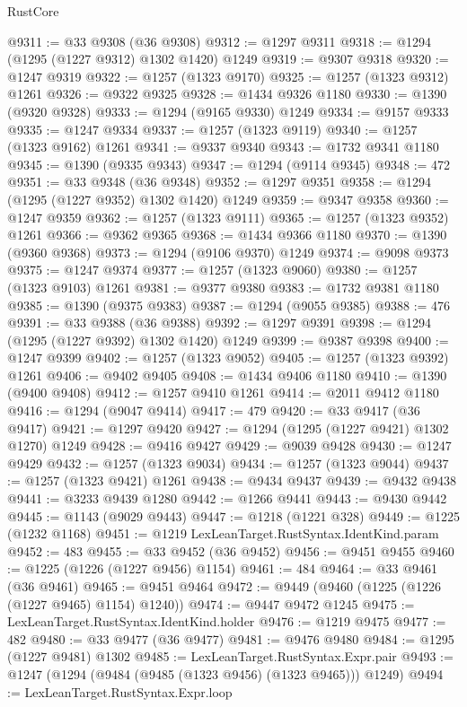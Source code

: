 \begin{lexlean}{RustCore}
\begin{coremodule}
@9311 := @33 @9308 (@36 @9308)
@9312 := @1297 @9311
@9318 := @1294 (@1295 (@1227 @9312) @1302 @1420) @1249
@9319 := @9307 @9318
@9320 := @1247 @9319
@9322 := @1257 (@1323 @9170)
@9325 := @1257 (@1323 @9312) @1261
@9326 := @9322 @9325
@9328 := @1434 @9326 @1180
@9330 := @1390 (@9320 @9328)
@9333 := @1294 (@9165 @9330) @1249
@9334 := @9157 @9333
@9335 := @1247 @9334
@9337 := @1257 (@1323 @9119)
@9340 := @1257 (@1323 @9162) @1261
@9341 := @9337 @9340
@9343 := @1732 @9341 @1180
@9345 := @1390 (@9335 @9343)
@9347 := @1294 (@9114 @9345)
@9348 := 472
@9351 := @33 @9348 (@36 @9348)
@9352 := @1297 @9351
@9358 := @1294 (@1295 (@1227 @9352) @1302 @1420) @1249
@9359 := @9347 @9358
@9360 := @1247 @9359
@9362 := @1257 (@1323 @9111)
@9365 := @1257 (@1323 @9352) @1261
@9366 := @9362 @9365
@9368 := @1434 @9366 @1180
@9370 := @1390 (@9360 @9368)
@9373 := @1294 (@9106 @9370) @1249
@9374 := @9098 @9373
@9375 := @1247 @9374
@9377 := @1257 (@1323 @9060)
@9380 := @1257 (@1323 @9103) @1261
@9381 := @9377 @9380
@9383 := @1732 @9381 @1180
@9385 := @1390 (@9375 @9383)
@9387 := @1294 (@9055 @9385)
@9388 := 476
@9391 := @33 @9388 (@36 @9388)
@9392 := @1297 @9391
@9398 := @1294 (@1295 (@1227 @9392) @1302 @1420) @1249
@9399 := @9387 @9398
@9400 := @1247 @9399
@9402 := @1257 (@1323 @9052)
@9405 := @1257 (@1323 @9392) @1261
@9406 := @9402 @9405
@9408 := @1434 @9406 @1180
@9410 := @1390 (@9400 @9408)
@9412 := @1257 @9410 @1261
@9414 := @2011 @9412 @1180
@9416 := @1294 (@9047 @9414)
@9417 := 479
@9420 := @33 @9417 (@36 @9417)
@9421 := @1297 @9420
@9427 := @1294 (@1295 (@1227 @9421) @1302 @1270) @1249
@9428 := @9416 @9427
@9429 := @9039 @9428
@9430 := @1247 @9429
@9432 := @1257 (@1323 @9034)
@9434 := @1257 (@1323 @9044)
@9437 := @1257 (@1323 @9421) @1261
@9438 := @9434 @9437
@9439 := @9432 @9438
@9441 := @3233 @9439 @1280
@9442 := @1266 @9441
@9443 := @9430 @9442
@9445 := @1143 (@9029 @9443)
@9447 := @1218 (@1221 @328)
@9449 := @1225 (@1232 @1168)
@9451 := @1219 LexLeanTarget.RustSyntax.IdentKind.param
@9452 := 483
@9455 := @33 @9452 (@36 @9452)
@9456 := @9451 @9455
@9460 := @1225 (@1226 (@1227 @9456) @1154)
@9461 := 484
@9464 := @33 @9461 (@36 @9461)
@9465 := @9451 @9464
@9472 := @9449 (@9460 (@1225 (@1226 (@1227 @9465) @1154) @1240))
@9474 := @9447 @9472 @1245
@9475 := LexLeanTarget.RustSyntax.IdentKind.holder
@9476 := @1219 @9475
@9477 := 482
@9480 := @33 @9477 (@36 @9477)
@9481 := @9476 @9480
@9484 := @1295 (@1227 @9481) @1302
@9485 := LexLeanTarget.RustSyntax.Expr.pair
@9493 := @1247 (@1294 (@9484 (@9485 (@1323 @9456) (@1323 @9465))) @1249)
@9494 := LexLeanTarget.RustSyntax.Expr.loop

\end{coremodule}
\end{lexlean}
